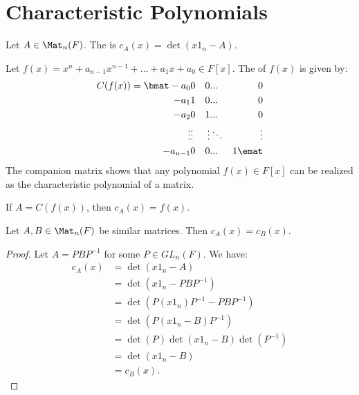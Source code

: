 \section{Characteristic Polynomials}
    \begin{definition}
        Let $A \in \Mat_n(F)$. The  is $c_A(x) = \det(x 1_n - A)$.
    \end{definition}

    \begin{definition}
        Let $f(x) = x^n + a_{n-1}x^{n-1} + ... + a_1 x + a_0 \in F[x]$. The  of $f(x)$ is given by:
            \begin{equation*}
            \begin{split}
                C(f(x)) = 
                \bmat
                -a_0 & 0 & 0 & ... & 0\\
                -a_1 & 1 & 0 & ... & 0\\
                -a_2 & 0 & 1 & ... & 0\\
                \vdots & \vdots & \vdots & \ddots & \vdots \\
                -a_{n-1} & 0 & 0 & ... & 1
                \emat
            \end{split}
            \end{equation*}
        The companion matrix shows that any polynomial $f(x) \in F[x]$ can be realized as the characteristic polynomial of a matrix.
    \end{definition}

    \begin{lemma}
        If $A = C(f(x))$, then $c_A(x) = f(x)$.
    \end{lemma}

    \begin{lemma}
        Let $A,B \in \Mat_n(F)$ be similar matrices. Then $c_A(x) = c_B(x)$.
    \end{lemma}
        \begin{proof}
            Let $A = PBP^{-1}$ for some $P \in GL_n(F)$. We have:
                \begin{equation*}
                \begin{split}
                    c_A(x)
                    & = \det(x1_n - A) \\
                    & = \det(x1_n - PBP^{-1}) \\
                    & = \det(P(x1_n)P^{-1} - PBP^{-1}) \\
                    & = \det(P(x1_n - B)P^{-1}) \\
                    & = \det(P)\det(x1_n - B)\det(P^{-1}) \\
                    & = \det(x1_n - B) \\
                    & = c_B(x).
                \end{split}
                \end{equation*}
        \end{proof}

